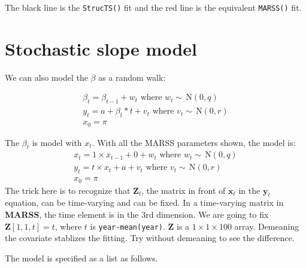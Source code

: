 \documentclass[12pt,]{book}
\begin{document}
The black line is the \texttt{StrucTS()} fit and the red line is the equivalent \texttt{MARSS()} fit.

\hypertarget{stochastic-slope-model}{%
\section{Stochastic slope model}\label{stochastic-slope-model}}

We can also model the \(\beta\) as a random walk:

\begin{equation}
\begin{gathered}
\beta_t = \beta_{t-1}+w_t \text{ where } w_t \sim \,\text{N}(0,q) \\
y_t = a + \beta_t*t + v_t \text{ where } v_t \sim \,\text{N}(0,r)  \\
x_0 = \pi 
\end{gathered}   
\label{eq:short-stoch-slope-model}
\end{equation}

The \(\beta_t\) is model with \(x_t\). With all the MARSS parameters shown, the model is:
\begin{equation}
\begin{gathered}
x_t = 1 \times x_{t-1}+ 0 + w_t    \text{ where } w_t \sim \,\text{N}(0,q) \\
y_t = t \times x_t + a + v_t \text{ where } v_t \sim \,\text{N}(0,r)  \\
x_0 = \pi 
 \end{gathered}   
\label{eq:short-stoch-slope-model2}
\end{equation}
The trick here is to recognize that \(\mathbf{Z}_t\), the matrix in front of \(\mathbf{x}_t\) in the \(\mathbf{y}_t\) equation, can be time-varying and can be fixed. In a time-varying matrix in \textbf{MARSS}, the time element is in the 3rd dimension. We are going to fix \(\mathbf{Z}[1,1,t] = t\), where \(t\) is \texttt{year-mean(year)}. \(\mathbf{Z}\) is a \(1 \times 1 \times 100\) array. Demeaning the covariate stablizes the fitting. Try without demeaning to see the difference.

The model is specified as a list as follows.
\end{document}
